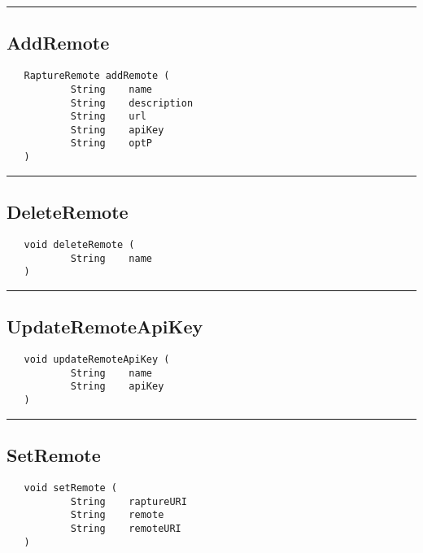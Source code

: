 \rule{15cm}{2pt}
\subsection{AddRemote}
\label{Api:AddRemote}
\begin{verbatim}
   RaptureRemote addRemote (
           String    name
           String    description
           String    url
           String    apiKey
           String    optP
   )
\end{verbatim}



\rule{15cm}{2pt}
\subsection{DeleteRemote}
\label{Api:DeleteRemote}
\begin{verbatim}
   void deleteRemote (
           String    name
   )
\end{verbatim}



\rule{15cm}{2pt}
\subsection{UpdateRemoteApiKey}
\label{Api:UpdateRemoteApiKey}
\begin{verbatim}
   void updateRemoteApiKey (
           String    name
           String    apiKey
   )
\end{verbatim}



\rule{15cm}{2pt}
\subsection{SetRemote}
\label{Api:SetRemote}
\begin{verbatim}
   void setRemote (
           String    raptureURI
           String    remote
           String    remoteURI
   )
\end{verbatim}




